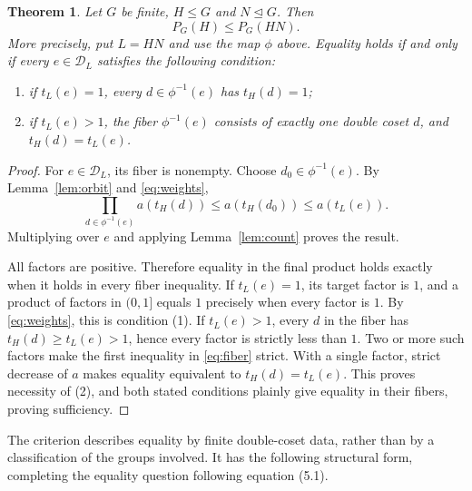\documentclass[11pt]{article}
\newtheorem{theorem}{Theorem}
\newcommand{\PP}{P}
\newcommand{\DD}{\mathcal D}
\begin{document}
\begin{theorem}\label{thm:main}
Let $G$ be finite, $H\leq G$ and $N\trianglelefteq G$. Then
\[
 \PP_G(H)\leq\PP_G(HN).
\]
More precisely, put $L=HN$ and use the map $\phi$ above. Equality holds if
and only if every $e\in\DD_L$ satisfies the following condition:
\begin{enumerate}
\item if $t_L(e)=1$, every $d\in\phi^{-1}(e)$ has $t_H(d)=1$;
\item if $t_L(e)>1$, the fiber $\phi^{-1}(e)$ consists of exactly one
double coset $d$, and $t_H(d)=t_L(e)$.
\end{enumerate}
\end{theorem}
\begin{proof}
For $e\in\DD_L$, its fiber is nonempty. Choose $d_0\in\phi^{-1}(e)$.
By Lemma~\ref{lem:orbit} and \eqref{eq:weights},
\begin{equation}\label{eq:fiber}
 \prod_{d\in\phi^{-1}(e)}a(t_H(d))
 \leq a(t_H(d_0))\leq a(t_L(e)).
\end{equation}
Multiplying over $e$ and applying Lemma~\ref{lem:count} proves the result.

All factors are positive. Therefore equality in the final product holds
exactly when it holds in every fiber inequality. If $t_L(e)=1$, its target
factor is $1$, and a product of factors in $(0,1]$ equals $1$ precisely when
every factor is $1$. By \eqref{eq:weights}, this is condition (1).
If $t_L(e)>1$, every $d$ in the fiber has $t_H(d)\geq t_L(e)>1$, hence
every factor is strictly less than $1$. Two or more such factors make the
first inequality in \eqref{eq:fiber} strict. With a single factor, strict
decrease of $a$ makes equality equivalent to $t_H(d)=t_L(e)$.
This proves necessity of (2), and both stated conditions plainly give
equality in their fibers, proving sufficiency.
\end{proof}

The criterion describes equality by finite double-coset data, rather than
by a classification of the groups involved. It has the following structural
form, completing the equality question following equation (5.1).
\end{document}
